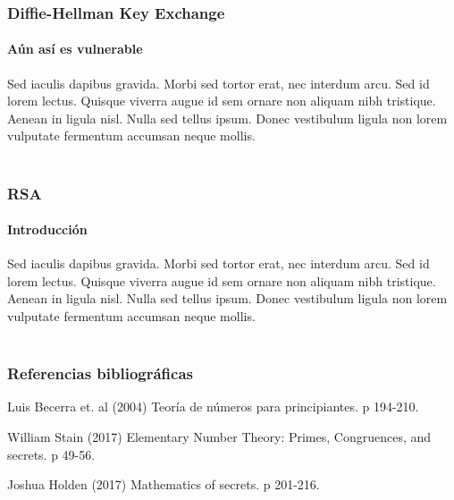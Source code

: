 \documentclass[spanish, mexico]{beamer}
\begin{document}
	\begin{frame}
		\frametitle{Diffie-Hellman Key Exchange}
		\framesubtitle{Aún así es vulnerable}
		Sed iaculis dapibus gravida. Morbi sed tortor erat, nec interdum arcu. Sed id lorem lectus. Quisque viverra augue id sem ornare non aliquam nibh tristique. Aenean in ligula nisl. Nulla sed tellus ipsum. Donec vestibulum ligula non lorem vulputate fermentum accumsan neque mollis.\\~\\
	\end{frame}

	\begin{frame}
		\frametitle{RSA}
		\framesubtitle{Introducción}
		Sed iaculis dapibus gravida. Morbi sed tortor erat, nec interdum arcu. Sed id lorem lectus. Quisque viverra augue id sem ornare non aliquam nibh tristique. Aenean in ligula nisl. Nulla sed tellus ipsum. Donec vestibulum ligula non lorem vulputate fermentum accumsan neque mollis.\\~\\
	\end{frame}

	\begin{frame}
		\frametitle{Referencias bibliográficas}
		\footnotesize{
		\begin{thebibliography}{1}
			 Luis Becerra et. al (2004)
			\newblock Teoría de números para principiantes.
			\newblock p 194-210.
		\end{thebibliography}
		\begin{thebibliography}{2}
			 William Stain (2017)
			\newblock Elementary Number Theory: Primes, Congruences, and secrets.
			\newblock p 49-56.
		\end{thebibliography}
		\begin{thebibliography}{3}
			 Joshua Holden (2017)
			\newblock Mathematics of secrets.
			\newblock p 201-216.
		\end{thebibliography}	
		}
	\end{frame}
\end{document}
